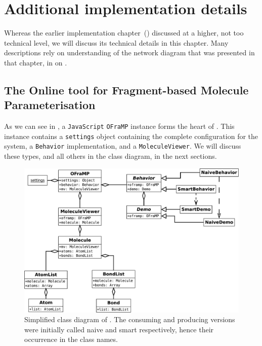 \chapter[Additional implementation]{Additional implementation details}

Whereas the earlier implementation chapter~() discussed \oframp{} at a higher, not too technical level, we will discuss its technical details in this chapter. Many descriptions rely on understanding of the network diagram that was presented in that chapter, in  on .



\section[\oframp]{The Online tool for Fragment-based Molecule Parameterisation}
As we can see in , a \verb|JavaScript| \verb|OFraMP| instance forms the heart of \oframp. This instance contains a \verb|settings| object containing the complete configuration for the system, a \verb|Behavior| implementation, and a \verb|MoleculeViewer|. We will discuss these types, and all others in the class diagram, in the next sections.

\begin{figure}
\center
\includegraphics[width=\textwidth]{img/oframp_class.pdf}
\caption{Simplified class diagram of \oframp. The consuming and producing versions were initially called naive and smart respectively, hence their occurrence in the class names.}
\end{figure}

